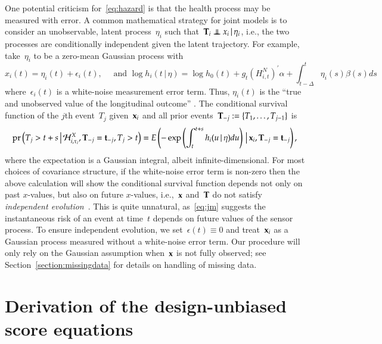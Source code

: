 \documentclass[12pt]{amsart}
\def\pr{\mathop{\text{pr}}\nolimits}
\def\pr{\mathop{\text{pr}}\nolimits}
\def\indep{\mathrel{\rlap{$\perp$}\kern1.6pt\mathord{\perp}}}
\def\H{\mathcal{H}}
\def\given{\, | \,}
\def\Given{\, \big | \,}
\def\bft{{\bf t}}
\def\bfx{{\bf x}}
\def\bfT{{\bf T}}
\begin{document}
One potential criticism for~\eqref{eq:hazard} is that the health process may be measured with error. A common mathematical strategy for joint models is to consider an unobservable, latent process~$\eta_i$ such that~$\bfT_i \indep x_i \given \eta_i$, i.e., the two processes are conditionally independent given the latent trajectory. For example, take~$\eta_i$ to be a zero-mean Gaussian process with
\begin{equation}\label{eq:jm}
x_i(t) = \eta_i (t) + \epsilon_i (t),\quad \text{ and } \log h_i (t
\given \eta ) = \log h_0 (t) + g_t \left( H_{i,t}^N \right)^{\prime}
\alpha + \int_{t-\Delta}^t \eta_i (s) \beta (s) ds
\end{equation}
where~$\epsilon_i(t)$ is a white-noise measurement error term. Thus, $\eta_i (t)$ is the ``true and unobserved value of the longitudinal outcome'' \citep[Sec. 2.1, pp.3]{Rizopoulos2010}. The conditional survival function of the $j$th event~$T_j$ given~$\bfx_i$ and all prior events~$\bfT_{-j} := \{ T_1, \ldots, T_{j-1} \}$ is
\[
\pr \left ( T_j > t+s \Given \H_{i,\tau_i}^X, \bfT_{-j} = \bft_{-j}, T_j > t \right) = E \left( - \exp \left( \int_{t}^{t+s} h_i (u \given \eta ) du \right) \Given \bfx_i, \bfT_{-j} = \bft_{-j} \right),
\]
where the expectation is a Gaussian integral, albeit infinite-dimensional.  For most choices of covariance structure, if the white-noise error term is non-zero then the above calculation will show the conditional survival function depends not only on past $x$-values, but also on future $x$-values, i.e.,~$\bfx$ and~$\bfT$ do not satisfy \emph{independent evolution}~\citep{DempseyPMCC2}. This is quite unnatural, as~\eqref{eq:jm} suggests the instantaneous risk of an event at time~$t$ depends on future values of the sensor process. To ensure independent evolution, we set~$\epsilon (t) \equiv 0$ and treat~$\bfx_i$ as a Gaussian process measured without a white-noise error term.
Our procedure will only rely on the Gaussian assumption when~$\bfx$ is not fully observed; see Section~\ref{section:missingdata} for details on handling of missing data.


\section{Derivation of the design-unbiased score equations}
\label{app:prooflemma31}
\end{document}
